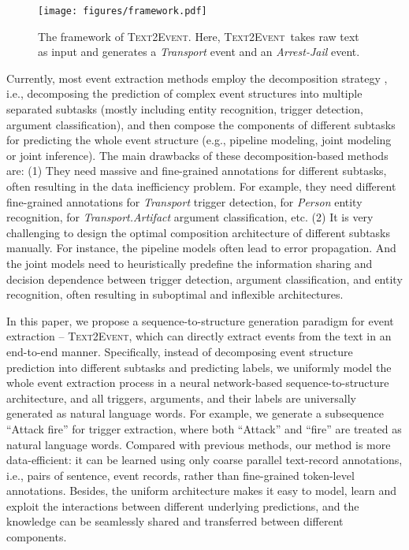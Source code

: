 \documentclass[11pt,a4paper]{article}
\newcommand\modelname{\textsc{Text2Event}}
\newcommand{\eventtpye}[1]{\textit{#1}}
\begin{document}
\begin{figure}[!tpb]
    \centering
    \texttt{[image: figures/framework.pdf]}
    \caption{
        The framework of \modelname.
        Here, \modelname\, takes  raw  text as  input  and  generates a \eventtpye{Transport} event and an \eventtpye{Arrest-Jail} event.
        }
    \label{fig:motivation}
\end{figure}

Currently, most event extraction methods employ the decomposition strategy \citep{chen-etal-2015-event,Nguyen-Nguyen:2019:AAAI2019,wadden-etal-2019-entity,Zhang:2019:GAIL,du-cardie-2020-event,li-etal-2020-event,paolini2021structured}, i.e., decomposing the prediction of complex event structures into multiple separated subtasks (mostly including entity recognition, trigger detection, argument classification), and then compose the components of different subtasks for predicting the whole event structure (e.g., pipeline modeling, joint modeling or joint inference).
The main drawbacks of these decomposition-based methods are:
(1) They need massive and fine-grained annotations for different subtasks, often resulting in the data inefficiency problem.
For example, they need different fine-grained annotations for \eventtpye{Transport} trigger detection, for \eventtpye{Person} entity recognition, for \eventtpye{Transport.Artifact} argument classification, etc.
(2) It is very challenging to design the optimal composition architecture of different subtasks manually.
For instance, the pipeline models often lead to error propagation.
And the joint models need to heuristically predefine the information sharing and decision dependence between trigger detection, argument classification, and entity recognition, often resulting in suboptimal and inflexible architectures.

In this paper, we propose a sequence-to-structure generation paradigm for event extraction -- \modelname, which can directly extract events from the text in an end-to-end manner.
Specifically, instead of decomposing event structure prediction into different subtasks and predicting labels, we uniformly model the whole event extraction process in a neural network-based sequence-to-structure architecture, and all triggers, arguments, and their labels are universally generated as natural language words.
For example, we generate a subsequence ``Attack fire'' for trigger extraction, where both ``Attack'' and ``fire'' are treated as natural language words.
Compared with previous methods, our method is more data-efficient: it can be learned using only coarse parallel text-record annotations, i.e., pairs of sentence, event records, rather than fine-grained token-level annotations.
Besides, the uniform architecture makes it easy to model, learn and exploit the interactions between different underlying predictions, and the knowledge can be seamlessly shared and transferred between different components.
\end{document}
